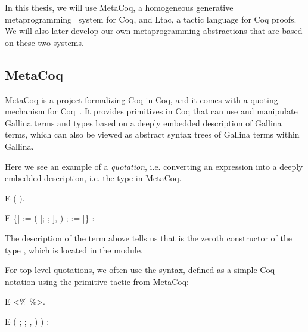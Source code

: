 In this thesis, we will use MetaCoq, a homogeneous generative \gls{metaprogramming}~\cite{hgmp} system for Coq, and \gls{Ltac}, a tactic language for Coq proofs. We will also later develop our own \gls{metaprogramming} abstractions that are based on these two systems.

\subsection{MetaCoq}
\label{metacoq}
MetaCoq is a project formalizing Coq in Coq, and it comes with a quoting mechanism for Coq~\cite{templatecoq, sozeau2020metacoq}. It provides \gls{primitive}s in Coq that can use and manipulate \gls{Gallina} terms and types based on a deeply embedded description of \gls{Gallina} terms, which can also be viewed as abstract syntax trees of \gls{Gallina} terms within \gls{Gallina}.

Here we see an example of a \emph{\gls{quotation}}, i.e. converting an expression into a deeply embedded description, i.e. the  type in MetaCoq. 

\vspace{.2in}
\begin{SaveVerbatim}{E}
 (  \fn{>>}\fn{=} ).
\end{SaveVerbatim}

\begin{SaveVerbatim}{E}
  \{|  := ( [; ; ], )
   ;  :=  |\}  \dt{[]} : 
\end{SaveVerbatim}

The description of the term  above tells us that  is the zeroth constructor of the type , which is located in the  module.

For top-level quotations, we often use the  syntax, defined as a simple Coq notation using the primitive tactic from MetaCoq:

\vspace{.2in}
\begin{SaveVerbatim}{E}
 <\%  \%>.
\end{SaveVerbatim}

\begin{SaveVerbatim}{E}
 ( \dt{[}; ; \dt{]}, ) \dt{[]})
  : 
\end{SaveVerbatim}

